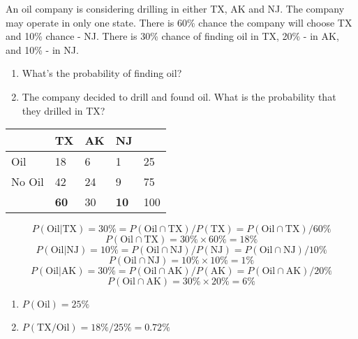 \documentclass{homework}
\begin{document}
\newpage
\begin{problem}[5]
    An oil company is considering drilling in either TX, AK and NJ. The company may operate in only one state. There is 60\% chance the company will choose TX and 10\% chance - NJ. There is 30\% chance of finding oil in TX, 20\% - in AK, and 10\% - in NJ.

    \begin{enumerate}
        \item What’s the probability of finding oil?
        \item The company decided to drill and found oil. What is the probability that they drilled in TX?
    \end{enumerate}

\end{problem}

\begin{solution}
    \begin{table}[h]
        \centering
        
        \begin{tabular}{@{}l|l|l|l|l@{}}
        & TX & AK & NJ & \\
        \midrule
        Oil & 18 & 6 & 1 & 25\\
        No Oil & 42 & 24 & 9 & 75\\
        \midrule
        & \textbf{60} &  30 & \textbf{10} & 100
        \end{tabular}
    \end{table}

    $$ 
    P(\text{Oil} | \text{TX}) = 30 \% = P(\text{Oil} \cap \text{TX})/P(\text{TX}) = P(\text{Oil} \cap \text{TX})/60 \%
    $$
    $$
    P(\text{Oil} \cap \text{TX}) = 30 \% \times 60 \% = 18\%
    $$
    $$ 
    P(\text{Oil} | \text{NJ}) = 10 \% = P(\text{Oil} \cap \text{NJ})/P(\text{NJ}) = P(\text{Oil} \cap \text{NJ})/10 \%
    $$
    $$
    P(\text{Oil} \cap \text{NJ}) = 10 \% \times 10 \% = 1\%
    $$
    $$ 
    P(\text{Oil} | \text{AK}) = 30 \% = P(\text{Oil} \cap \text{AK})/P(\text{AK}) = P(\text{Oil} \cap \text{AK})/20 \%
    $$
    $$
    P(\text{Oil} \cap \text{AK}) = 30 \% \times 20 \% = 6\%
    $$

    \begin{enumerate}
        \item $P(\text{Oil}) = 25\%$
        \item $P(\text{TX}/\text{Oil}) = 18\%/25\% = 0.72\%$
    \end{enumerate}

\end{solution}
\end{document}
